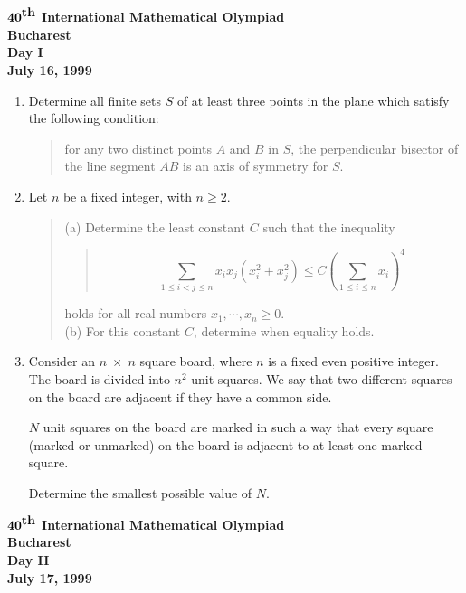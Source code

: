 \documentclass[12pt]{article}
\begin{document}
\begin{center}
${\bf 40}^{\mbox{\bf th}}$ {\bf International
Mathematical Olympiad} \\[.1in]
{\bf Bucharest} \\ [.05in]
{\bf Day I}\\[.05in]
{\bf July 16, 1999}
\end{center}

\vspace*{.3in}

\begin{enumerate}
\item %
Determine all finite sets $S$ of at least three points in the plane which satisfy the following condition: 
\begin{quote}
     for any two distinct points $A$ and $B$ in $S$, the perpendicular bisector of the line segment $AB$ 
     is an axis of symmetry for $S$.
\end{quote}

\item %
Let $n$ be a fixed integer, with $n \geq 2$. 
\begin{quote}
     (a) Determine the least constant $C$ such that the inequality 
\begin{quote}
\[\sum_{1\leq i<j \leq n} x_i x_j (x_i^2 + x_j^2) \leq C \left(\sum_{1 \leq i \leq n}x_i\right)^4 \]                                                              \end{quote}        

     holds for all real numbers $x_1,\cdots,x_n \geq 0$. \\


     (b) For this constant $C$, determine when equality holds. 
\end{quote}
\item %
Consider an $n\; \times \;n$ square board, where $n$ is a fixed even positive integer. The board is divided into $n^2$ unit squares. We say that two
different squares on the board are adjacent if they have a common side. 

$N$ unit squares on the board are marked in such a way that every square (marked or unmarked) on the board is adjacent to at least
one marked square. 

Determine the smallest possible value of $N$. 

\end{enumerate}

\pagebreak %
\begin{center}
${\bf 40}^{\mbox{\bf th}}$ {\bf International
Mathematical Olympiad} \\[.1in]
{\bf Bucharest} \\ [.05in]
{\bf Day II}\\[.05in]
{\bf July 17, 1999}
\end{center}
\end{document}
